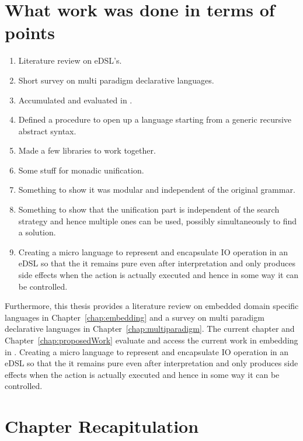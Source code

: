 \documentclass[thesis-solanki.tex]{subfiles}
\begin{document}
\section{What work was done in terms of points}\label{sec:work-in-points}
\begin{enumerate}
\item Literature review on eDSL's.

\item Short survey on multi paradigm declarative languages.

\item Accumulated and evaluated  in .

\item Defined a procedure to open up a language starting from a generic recursive abstract syntax.

\item Made a few libraries to work together.

\item Some stuff for monadic unification.

\item Something to show it was modular and independent of the original grammar.

\item
  Something to show that the unification part is independent of the search strategy and hence multiple ones can be
  used, possibly simultaneously to find a solution.

\item
  Creating a micro language to represent and encapsulate IO operation in an eDSL so that the it remains pure even
  after interpretation and only produces side effects when the action is actually executed and hence in some way it
  can be controlled.

\end{enumerate}

Furthermore, this thesis provides a literature review on embedded domain specific languages in Chapter~\ref{chap:embedding} and a survey on
multi paradigm declarative languages in Chapter~\ref{chap:multiparadigm}. The current chapter and Chapter~\ref{chap:proposedWork} evaluate 
and access the current work in embedding  in .  Creating a micro language to represent and encapsulate 
IO operation in an eDSL so that the it remains pure even after interpretation and only produces side effects when the action is actually 
executed and hence in some way it can be controlled.


\section{Chapter Recapitulation}


\ifMain
\begin{scope}
  \nolinenumbers
  \enotesize
  \par
  \begin{singlespace}
  \setlength{\parskip}{12pt plus 2pt minus 1pt}
  \theendnotes
  \par
  \end{singlespace}
\end{scope}
\fi
\end{document}
